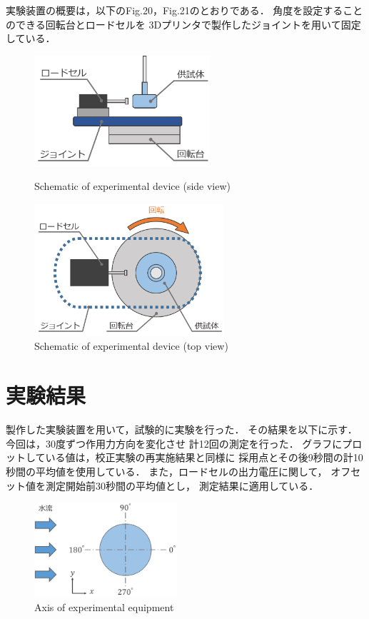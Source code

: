 \documentclass[twocolumn,a4j]{jsarticle}
\begin{document}
実験装置の概要は，以下のFig.20，Fig.21のとおりである．
角度を設定することのできる回転台とロードセルを
3Dプリンタで製作したジョイントを用いて固定している．

\begin{figure}[htbp]
    \footnotesize
    \begin{center}
        \includegraphics[width=65mm]{../images/rotation.png}
        \caption{Schematic of experimental device (side view)}
        \includegraphics[width=70mm]{../images/rotation_2.png}
        \caption{Schematic of experimental device (top view)}
    \end{center}
\end{figure}

\newpage

\section{実験結果}
製作した実験装置を用いて，試験的に実験を行った．
その結果を以下に示す．
今回は，30度ずつ作用力方向を変化させ
計12回の測定を行った．
グラフにプロットしている値は，校正実験の再実施結果と同様に
採用点とその後9秒間の計10秒間の平均値を使用している．
また，ロードセルの出力電圧に関して，
オフセット値を測定開始前30秒間の平均値とし，
測定結果に適用している．

\begin{figure}[htbp]
    \footnotesize
    \begin{center}
        \includegraphics[width=53mm]{../images/model_1.png}
        \caption{Axis of experimental equipment}
    \end{center}
\end{figure}
\end{document}
